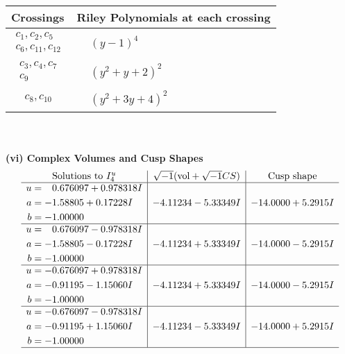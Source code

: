 \documentclass[1p]{elsarticle_modified}
\theoremstyle{definition}
\newcommand{\I}{\sqrt{-1}}
\begin{document}
\begin{tabular}{m{50pt}|m{274pt}}
Crossings & \hspace{64pt}Riley Polynomials at each crossing \\
\hline $$\begin{aligned}c_{1},c_{2},c_{5}\\c_{6},c_{11},c_{12}\end{aligned}$$&$\begin{aligned}
&(y-1)^4
\end{aligned}$\\
\hline $$\begin{aligned}c_{3},c_{4},c_{7}\\c_{9}\end{aligned}$$&$\begin{aligned}
&(y^2+y+2)^2
\end{aligned}$\\
\hline $$\begin{aligned}c_{8},c_{10}\end{aligned}$$&$\begin{aligned}
&(y^2+3 y+4)^2
\end{aligned}$\\
\hline
\end{tabular}\\~\\
\newpage\flushleft \textbf{(vi) Complex Volumes and Cusp Shapes}
$$\begin{array}{c|c|c}  
\text{Solutions to }I^u_{4}& \I (\text{vol} + \sqrt{-1}CS) & \text{Cusp shape}\\
 \hline 
\begin{aligned}
u &= \phantom{-}0.676097 + 0.978318 I \\
a &= -1.58805 + 0.17228 I \\
b &= -1.00000\phantom{ +0.000000I}\end{aligned}
 & -4.11234 - 5.33349 I & -14.0000 + 5.2915 I \\ \hline\begin{aligned}
u &= \phantom{-}0.676097 - 0.978318 I \\
a &= -1.58805 - 0.17228 I \\
b &= -1.00000\phantom{ +0.000000I}\end{aligned}
 & -4.11234 + 5.33349 I & -14.0000 - 5.2915 I \\ \hline\begin{aligned}
u &= -0.676097 + 0.978318 I \\
a &= -0.91195 - 1.15060 I \\
b &= -1.00000\phantom{ +0.000000I}\end{aligned}
 & -4.11234 + 5.33349 I & -14.0000 - 5.2915 I \\ \hline\begin{aligned}
u &= -0.676097 - 0.978318 I \\
a &= -0.91195 + 1.15060 I \\
b &= -1.00000\phantom{ +0.000000I}\end{aligned}
 & -4.11234 - 5.33349 I & -14.0000 + 5.2915 I\\
 \hline 
 \end{array}$$\newpage\newpage\renewcommand{\arraystretch}{1}
\end{document}
